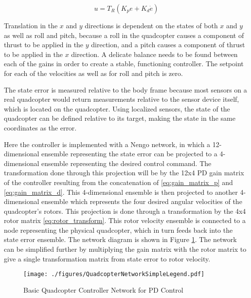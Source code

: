 \documentclass[letterpaper, 10 pt, conference]{ieeeconf}  %
\begin{document}
\begin{equation} \label{eq:control_equation}
u = T_{R}(K_{p}e + K_{d}\dot{e})
\end{equation}

Translation in the $x$ and $y$ directions is dependent on the states of both $x$ and $y$ as well as roll and pitch, because a roll in the quadcopter causes a component of thrust to be applied in the $y$ direction, and a pitch causes a component of thrust to be applied in the $x$ direction.
A delicate balance needs to be found between each of the gains in order to create a stable, functioning controller. 
The setpoint for each of the velocities as well as for roll and pitch is zero.

The state error is measured relative to the body frame because most sensors on a real quadcopter would return measurements relative to the sensor device itself, which is located on the quadcopter. Using localized sensors, the state of the quadcopter can be defined relative to its target, making the state in the same coordinates as the error.

Here the controller is implemented with a Nengo network, in which a 12-dimensional ensemble representing the state error can be projected to a 4-dimensional ensemble representing the desired control command. 
The transformation done through this projection will be by the 12x4 PD gain matrix of the controller resulting from the concatenation of \eqref{eq:gain_matrix_p} and \eqref{eq:gain_matrix_d}. 
This 4-dimensional ensemble is then projected to another 4-dimensional ensemble which represents the four desired angular velocities of the quadcopter's rotors. 
This projection is done through a transformation by the 4x4 rotor matrix \eqref{eq:rotor_transform}. 
This rotor velocity ensemble is connected to a node representing the physical quadcopter, which in turn feeds back into the state error ensemble. 
The network diagram is shown in Figure \ref{fig:NetBasic}. 
The network can be simplified further by multiplying the gain matrix with the rotor matrix to give a single transformation matrix from state error to rotor velocity. 

\begin{figure}
\centering
\texttt{[image: ./figures/QuadcopterNetworkSimpleLegend.pdf]}
\caption{Basic Quadcopter Controller Network for PD Control}
\label{fig:NetBasic}
\end{figure}
\end{document}
